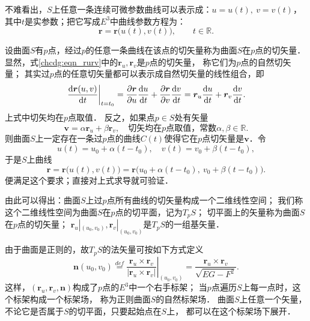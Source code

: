 
不难看出，$S$上任意一条连续可微参数曲线可以表示成：$u=u(t),\ v=v(t)$，
其中$t$是实参数；把它写成$E^3$中曲线参数方程为：
\begin{equation}
    \boldsymbol{r}= \boldsymbol{r}\bigl( u(t), v(t) \bigr),\qquad t\in \mathbb{R} .
\end{equation}

设曲面$S$有$p$点，经过$p$的任意一条曲线在该点的切矢量称为曲面$S$在$p$点的{\heiti 切矢量}．
显然，式\eqref{chcdg:eqn_rurv}中的$\boldsymbol{r}_u,\boldsymbol{r}_v$是$p$点的切矢量，
称它们为$p$点的{\heiti 自然切矢量}；
其实过$p$点的任意切矢量都可以表示成自然切矢量的线性组合，即
\begin{align}
    \left. \frac{{\rm d}\boldsymbol{r}(u,v)}{{\rm d} t} \right|_{t=t_0}
    = \frac{\partial \boldsymbol{r}}{\partial u} \frac{{\rm d}u }{{\rm d} t}
     +\frac{\partial \boldsymbol{r}}{\partial v} \frac{{\rm d}v }{{\rm d} t}
     =\boldsymbol{r}_u \frac{{\rm d}u }{{\rm d} t} + \boldsymbol{r}_v \frac{{\rm d}v }{{\rm d} t}.
\end{align}
上式中切矢均在$p$点取值．
反之，如果点$p\in S$处有矢量
\begin{equation}
    \boldsymbol{v}= \alpha \boldsymbol{r}_u + \beta \boldsymbol{r}_v,\quad
    \text{切矢均在$p$点取值，常数}\alpha,\beta \in \mathbb{R} .
\end{equation}
则曲面$S$上一定存在一条过$p$点的曲线$C(t)$使得它在$p$点切矢量是$\boldsymbol{v}$．令
\begin{equation}
    u(t)=u_0 + \alpha (t-t_0),\quad v(t)=v_0 + \beta (t-t_0) ,
\end{equation}
于是$S$上曲线
\begin{equation}
    \boldsymbol{r}=\boldsymbol{r}\bigl( u(t), v(t) \bigr)
    =\boldsymbol{r}\bigl(u_0 + \alpha (t-t_0),\ v_0 + \beta (t-t_0) \bigr) .
\end{equation}
便满足这个要求；直接对上式求导就可验证．

由此可以得出：曲面$S$上过$p$点所有曲线的切矢量构成一个二维线性空间；
我们称这个二维线性空间为曲面$S$在$p$点的{\heiti 切平面}，记为$T_pS$；
切平面上的矢量称为曲面$S$在$p$点的{\heiti 切矢量}；
$\boldsymbol{r}_u|_{(u_0,v_0)},\boldsymbol{r}_v|_{(u_0,v_0)}$是$T_pS$的一组基矢量．

由于曲面是正则的，故$T_pS$的法矢量可按如下方式定义
\begin{equation}\label{chcdg:eqn_Snormal}
    \boldsymbol{n}(u_0,v_0) \overset{def}{=} \left. \frac{\boldsymbol{r}_u \times \boldsymbol{r}_v}
    {|\boldsymbol{r}_u \times \boldsymbol{r}_v|} \right |_ {(u_0,v_0)}
    = \frac{\boldsymbol{r}_u \times \boldsymbol{r}_v} {\sqrt{EG-F^2}}.
\end{equation}
这样，$(\boldsymbol{r}_u , \boldsymbol{r}_v, \boldsymbol{n})$构成了$p$点的$E^3$中一个右手标架；
当$p$点遍历$S$上每一点时，这个标架构成一个标架场，
称为正则曲面$S$的{\heiti 自然标架场}．
曲面$S$上任意一个矢量，不论它是否属于$S$的切平面，只要起始点在$S$上，
都可以在这个标架场下展开．



